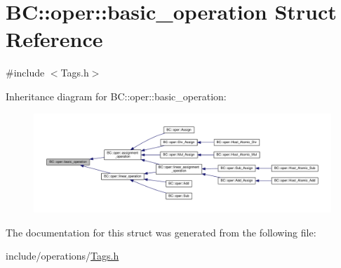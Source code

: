 \hypertarget{structBC_1_1oper_1_1basic__operation}{}\section{BC\+:\+:oper\+:\+:basic\+\_\+operation Struct Reference}
\label{structBC_1_1oper_1_1basic__operation}


{\ttfamily \#include $<$Tags.\+h$>$}



Inheritance diagram for BC\+:\+:oper\+:\+:basic\+\_\+operation\+:
\nopagebreak
\begin{figure}[H]
\begin{center}
\leavevmode
\includegraphics[width=350pt]{structBC_1_1oper_1_1basic__operation__inherit__graph}
\end{center}
\end{figure}


The documentation for this struct was generated from the following file\+:\begin{DoxyCompactItemize}
\item 
include/operations/\hyperlink{operations_2Tags_8h}{Tags.\+h}\end{DoxyCompactItemize}
